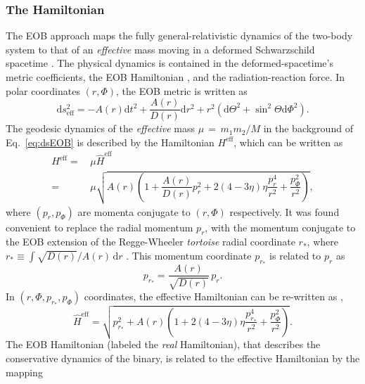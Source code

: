 \documentclass[aps,
prd,
amsmath,
amssymb,
twocolumn,
floatfix,
groupedaddress]{revtex4-1}
\newcommand{\D}{\mathrm{d}}
\newcommand{\eff}{\mathrm{eff}}
\def\l({\left(}
\def\r){\right)}
\begin{document}
\subsubsection{The Hamiltonian}\label{sec:level3:EOBNRv2:Hamiltonian}
The EOB approach maps the fully general-relativistic dynamics of the two-body system to that of an \textit{effective} mass moving in a deformed Schwarzschild spacetime \citep{EOBOriginalBuonannoDamour}. The physical dynamics is contained in the deformed-spacetime's metric coefficients, the EOB Hamiltonian \cite{EOBOriginalBuonannoDamour}, and the radiation-reaction force. In polar coordinates $(r,\Phi)$, the EOB metric is written as
\begin{equation}\label{eq:dsEOB}
\D s_{\eff}^2 = -A(r)\D t^2 + \dfrac{A(r)}{D(r)}\D r^2 + r^2\left(\D\Theta^2 + \sin^2\Theta \D\Phi^2\right).
\end{equation}
The geodesic dynamics of the \textit{effective} mass $\mu\,=\,m_1 m_2 / M$ in the background of Eq.~\eqref{eq:dsEOB} is described by the Hamiltonian $H^{\eff}$, which can be written as \citep{EOBOriginalBuonannoDamour,PadeAD}
\begin{equation}
\begin{split}
H^{\eff} =\, & \mu\hat{H}^{\eff} \\
         =\, & \mu\sqrt{A(r) \left( 1 +  \dfrac{A(r)}{D(r)}p_r^2 + 2(4 - 3\eta)\eta \dfrac{p_r^4}{r^2} + \dfrac{p^2_{\Phi}}{r^2} \right)},
\end{split}
\end{equation}
where $(p_r,p_{\Phi})$ are momenta conjugate to $(r,\Phi)$ respectively. It was found convenient to replace the radial momentum $p_r$, with the momentum conjugate to the EOB extension of the Regge-Wheeler \textit{tortoise} radial coordinate $r_*$, where $r_*\equiv\int\sqrt{D(r)}/A(r)\,\D r$ \citep{DamourNQC01} . This momentum coordinate $p_{r_*}$ is related to $p_r$ as
\begin{equation}
p_{r_*} = \dfrac{A(r)}{\sqrt{D(r)}}\,p_r.
\end{equation}
In $\l(r,\Phi,p_{r_*},p_{\Phi}\r)$ coordinates, the effective Hamiltonian can be re-written as \citep{BuonannoEOBv2Main},
\begin{equation}
\hat{H}^{\eff} = \sqrt{p^2_{r_*} + A(r) \left( 1 + 2(4 - 3\eta)\eta \dfrac{p_{r_*}^4}{r^2} + \dfrac{p^2_{\Phi}}{r^2} \right)}.
\end{equation}
The EOB Hamiltonian (labeled the \textit{real} Hamiltonian), that describes the conservative dynamics of the binary,  is related to the effective Hamiltonian by the mapping
\end{document}
